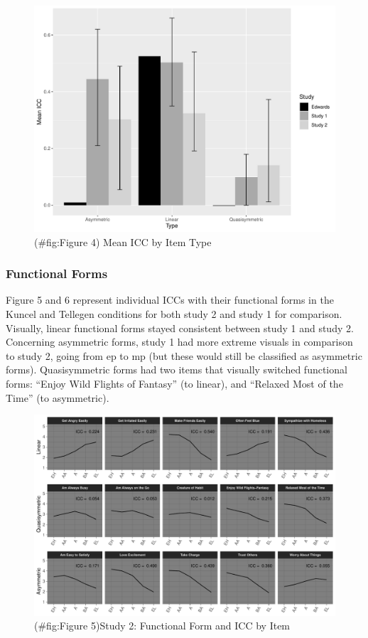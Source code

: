 \documentclass[
  ,jou]{apa6}
\begin{document}
\begin{figure}
\centering
\includegraphics{FullStudy_files/figure-latex/Figure 4-1.pdf}
\caption{(\#fig:Figure 4) Mean ICC by Item Type}
\end{figure}

\subsubsection{Functional Forms}\label{functional-forms}

Figure 5 and 6 represent individual ICCs with their functional forms in the Kuncel and Tellegen conditions for both study 2 and study 1 for comparison. Visually, linear functional forms stayed consistent between study 1 and study 2. Concerning asymmetric forms, study 1 had more extreme visuals in comparison to study 2, going from ep to mp (but these would still be classified as asymmetric forms). Quasisymmetric forms had two items that visually switched functional forms: ``Enjoy Wild Flights of Fantasy'' (to linear), and ``Relaxed Most of the Time'' (to asymmetric).

\begin{figure}
\centering
\includegraphics{FullStudy_files/figure-latex/Figure 5-1.pdf}
\caption{(\#fig:Figure 5)Study 2: Functional Form and ICC by Item}
\end{figure}
\end{document}
